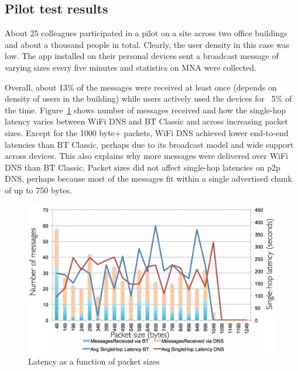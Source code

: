 \documentclass[conference]{IEEEtran}
\begin{document}
\subsection{Pilot test results}
\label{sec:romania}
%
About 25 colleagues participated in a pilot on a site across two
office buildings and about a thousand people in total.  Clearly, the
user density in this case was low. The app installed on their personal
devices sent a broadcast message of varying sizes every five minutes
and statistics on MNA were collected. 

Overall, about 13\% of the messages were received at least once
(depends on density of users in the building) while users actively
used the devices for ~5\% of the time.  Figure~\ref{fig:romania_lat}
shows number of messages received and how the single-hop latency
varies between WiFi DNS and BT Classic and across increasing packet
sizes. Except for the 1000 byte+ packets, WiFi DNS achieved lower
end-to-end latencies than BT Classic, perhaps due to its broadcast
model and wide support across devices. This also explains why more
messages were delivered over WiFi DNS than BT Classic. Packet sizes
did not affect single-hop latencies on p2p DNS, perhaps because most
of the messages fit within a single advertised chunk of up to 750
bytes.

\begin{figure}[htbp]
\centerline{\includegraphics[width=\columnwidth]{figs/romania_latency}}
\caption{Latency as a function of packet sizes}
\label{fig:romania_lat}
\end{figure}

\end{document}
